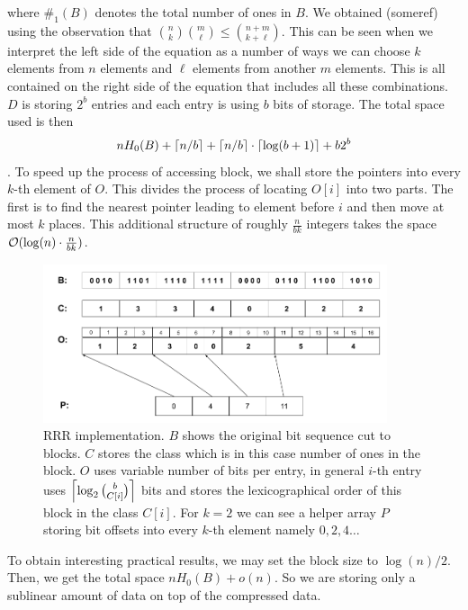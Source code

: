 where $\#_1(B)$ denotes the total number of ones in $B$. We obtained (someref) using the
observation that ${n\choose k} {m\choose \ell} \leq {n+m\choose k+\ell}$. This can be seen
when we interpret the left side of the equation as a number of ways we can choose $k$ elements
from $n$ elements and $\ell$ elements from another $m$ elements. This is all contained on the
right side of the equation that includes all these combinations. $D$ is storing $2^b$ entries
and each entry is using $b$ bits of storage.
The total space used is then $$nH_0(B) + \left\lceil n/b \right\rceil + \left\lceil n/b \right\rceil \cdot \left\lceil \log(b+1) \right\rceil + b2^b$$.
To speed up the process of accessing block, we shall store the pointers into every $k$-th element
of $O$. This divides the process of locating $O[i]$ into two parts. The first is to find the nearest
pointer leading to element before $i$ and then move at most $k$ places. This additional structure of
roughly $\frac{n}{bk}$ integers takes the space $\mathcal{O}(\log(n)\cdot \frac{n}{bk})$.

\begin{figure}
	\centerline{
		\includegraphics[width=0.9\textwidth, height=0.3\textheight]{images/rrr}
	}
	\caption[TODO]{RRR implementation. $B$ shows the original bit sequence cut to
    blocks. $C$ stores the class which is in this case number of ones in the block.
    $O$ uses variable number of bits per entry, in general $i$-th entry uses
    $\left\lceil \log_2{b\choose C[i]} \right\rceil$ bits and stores the lexicographical order
    of this block in the class $C[i]$. For $k=2$ we can see a helper array $P$
    storing bit offsets into every $k$-th element namely $0, 2, 4\ldots$
	}
	\label{obr:RRRFinal}
\end{figure}

To obtain interesting practical results, we may set the block size to $\log(n)/2$. Then, we
get the total space $nH_0(B) + o(n)$. So we are storing only a sublinear amount of data on
top of the compressed data.

